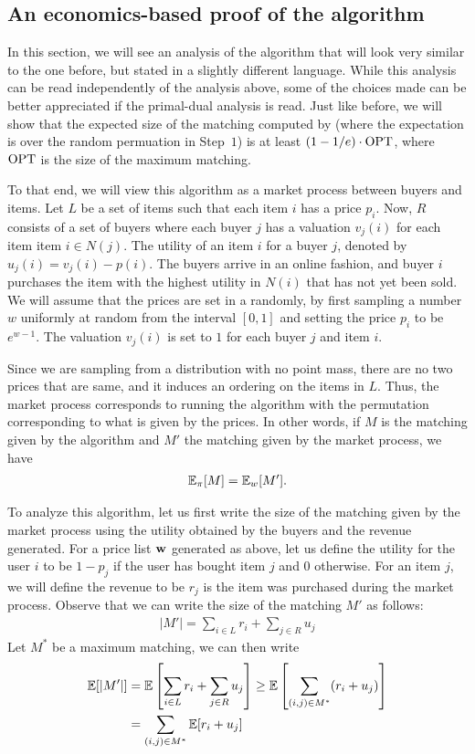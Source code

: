 \subsection{An economics-based proof of the \ranking algorithm}

In this section, we will see an analysis of the \ranking algorithm that will
look very similar to the one before, but stated in a slightly different
language. While this analysis can be read independently of the analysis above,
some of the choices made can be better appreciated if the primal-dual analysis
is read.  Just like before, we will show that the expected size of the matching
computed by \ranking (where the expectation is over the random permuation in
Step~$1$) is at least $(1-1/e)\cdot \operatorname{OPT}$, where $\operatorname{OPT}$ is the size of the
maximum matching.

To that end, we will view this algorithm as a market process between buyers and
items. Let $L$ be a set of items such that each item $i$ has a price $p_i$. Now,
$R$ consists of a set of buyers where each buyer $j$ has a valuation $v_j(i)$
for each item item $i \in N(j)$. The utility of an item $i$ for a buyer $j$,
denoted by $u_j(i) = v_j(i) - p(i)$. The buyers arrive in an online fashion, and
buyer $i$ purchases the item with the highest utility in $N(i)$ that has not yet
been sold. We will assume that the prices are set in a randomly, by first
sampling a number $w$ uniformly at random from the interval $[0,1]$ and setting
the price $p_i$ to be $e^{w-1}$. The valuation $v_j(i)$ is set to $1$ for each
buyer $j$ and item $i$.

Since we are sampling from a distribution with no point mass, there are no two prices that are same, and it induces an ordering on the items in $L$. Thus, the market process corresponds to running the \ranking algorithm with the permutation corresponding to what is given by the prices. In other words, if $M$ is the matching given by the \ranking algorithm and $M'$ the matching given by the market process, we have
\begin{align*}
	\mathbb{E}_\pi [M] = \mathbb{E}_w[M'].
\end{align*}

To analyze this algorithm, let us first write the size of the matching given by the market process using the utility obtained by the buyers and the revenue generated. For a price list $\mathbf{w}$ generated as above, let us define the utility for the user $i$ to be $1 - p_j$ if the user has bought item $j$ and $0$ otherwise. For an item $j$, we will define the revenue to be $r_j$ is the item was purchased during the market process. Observe that we can write the size of the matching $M'$ as follows:
\begin{align*}
	|M'| = \sum_{i\in L} r_i + \sum_{j\in R} u_j
\end{align*}
Let $M^*$ be a maximum matching, we can then write
\begin{align*}
	\mathbb{E}[|M'|] &= \mathbb{E}\left[\sum_{i\in L} r_i + \sum_{j\in R} u_j \right] \geq \mathbb{E}\left[ \sum_{(i,j)\in M^*} (r_i + u_j) \right]\\
	&= \sum_{(i,j)\in M^*} \mathbb{E}[r_i + u_j]
\end{align*}

